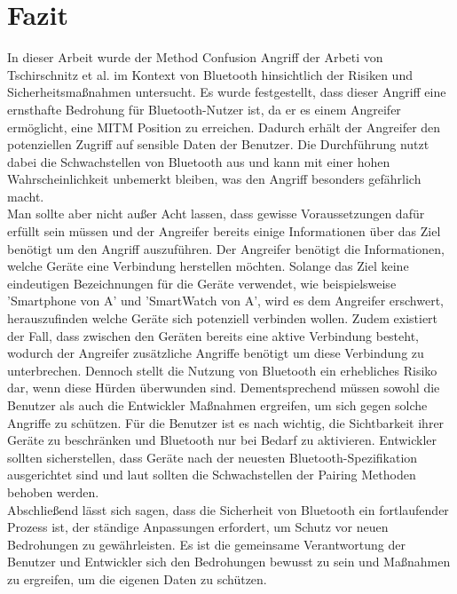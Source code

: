 \documentclass[
    a4paper,
    pagesize,
    pdftex,
    12pt,
]{scrartcl}
\begin{document}
\section{Fazit}
    In dieser Arbeit wurde der Method Confusion Angriff der Arbeti von Tschirschnitz et al. \cite{method_confusion_attack} im Kontext von Bluetooth hinsichtlich der Risiken und Sicherheitsmaßnahmen untersucht. Es wurde festgestellt, dass dieser Angriff eine ernsthafte Bedrohung für Bluetooth-Nutzer ist, da er es einem Angreifer ermöglicht, eine MITM Position zu erreichen. Dadurch erhält der Angreifer den potenziellen Zugriff auf sensible Daten der Benutzer. Die Durchführung nutzt dabei die Schwachstellen von Bluetooth aus und kann mit einer hohen Wahrscheinlichkeit unbemerkt bleiben, was den Angriff besonders gefährlich macht. \\
    Man sollte aber nicht außer Acht lassen, dass gewisse Voraussetzungen dafür erfüllt sein müssen und der Angreifer bereits einige Informationen über das Ziel benötigt um den Angriff auszuführen. Der Angreifer benötigt die Informationen, welche Geräte eine Verbindung herstellen möchten. Solange das Ziel keine eindeutigen Bezeichnungen für die Geräte verwendet, wie beispielsweise 'Smartphone von A' und 'SmartWatch von A', wird es dem Angreifer erschwert, herauszufinden welche Geräte sich potenziell verbinden wollen. Zudem existiert der Fall, dass zwischen den Geräten bereits eine aktive Verbindung besteht, wodurch der Angreifer zusätzliche Angriffe benötigt um diese Verbindung zu unterbrechen.
    Dennoch stellt die Nutzung von Bluetooth ein erhebliches Risiko dar, wenn diese Hürden überwunden sind. Dementsprechend müssen sowohl die Benutzer als auch die Entwickler Maßnahmen ergreifen, um sich gegen solche Angriffe zu schützen. Für die Benutzer ist es nach \cite{bluetooth_newest_security_risks} wichtig, die Sichtbarkeit ihrer Geräte zu beschränken und Bluetooth nur bei Bedarf zu aktivieren. Entwickler sollten sicherstellen, dass Geräte nach der neuesten Bluetooth-Spezifikation ausgerichtet sind und laut \cite{method_confusion_attack} sollten die Schwachstellen der Pairing Methoden behoben werden. \\
    Abschließend lässt sich sagen, dass die Sicherheit von Bluetooth ein fortlaufender Prozess ist, der ständige Anpassungen erfordert, um Schutz vor neuen Bedrohungen zu gewährleisten. Es ist die gemeinsame Verantwortung der Benutzer und Entwickler sich den Bedrohungen bewusst zu sein und Maßnahmen zu ergreifen, um die eigenen Daten zu schützen. 
    
    \newpage

    
    
\end{document}
